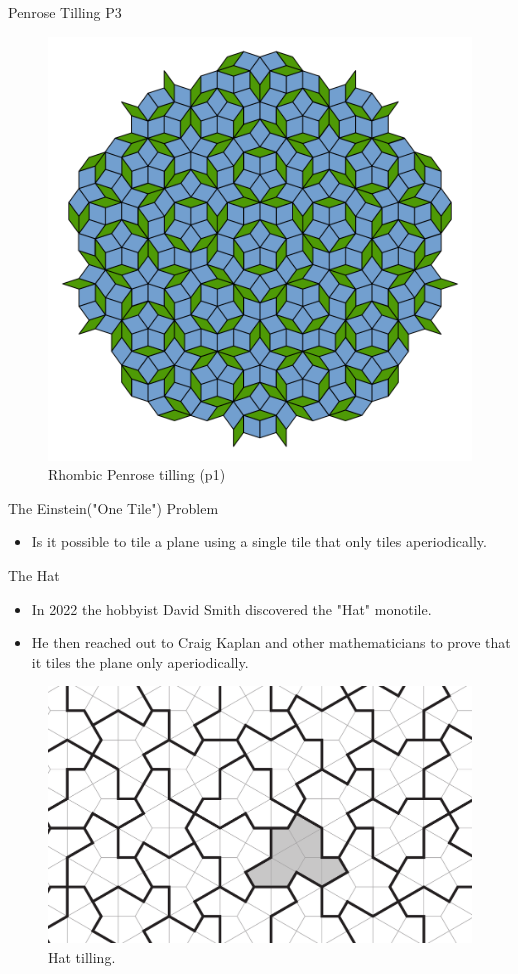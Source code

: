 \documentclass{beamer}
\begin{document}
\begin{frame}{Penrose Tilling P3}
    \begin{figure}
        \centering
        \includegraphics[width=0.6\linewidth]{images/penrose/Penrose_Tiling_(Rhombi).svg}
        \caption{Rhombic Penrose tilling (p1)\cite{penrose_tiling_rhombi}}
        \label{fig:penrose-rhombi}
    \end{figure}
\end{frame}

\begin{frame}{The Einstein("One Tile") Problem}
    \begin{itemize}
        \item Is it possible to tile a plane using a single tile that only tiles aperiodically.
    \end{itemize}
\end{frame}

\begin{frame}{The Hat}
    \begin{itemize}
        \item In 2022 the hobbyist David Smith discovered the "Hat" monotile.
        \item He then reached out to Craig Kaplan and other mathematicians to prove that it tiles the plane only aperiodically\cite{Smith_2024}.
    \end{itemize}
    
    \begin{figure}
        \centering
        \includegraphics[width=0.5\linewidth]{images/aperiodic-pdfs/polykite_tiling_raster.pdf}
        \caption{Hat tilling. \cite{Smith_2024}}
        \label{fig:hat-monotile}
    \end{figure}
\end{frame}
\end{document}
